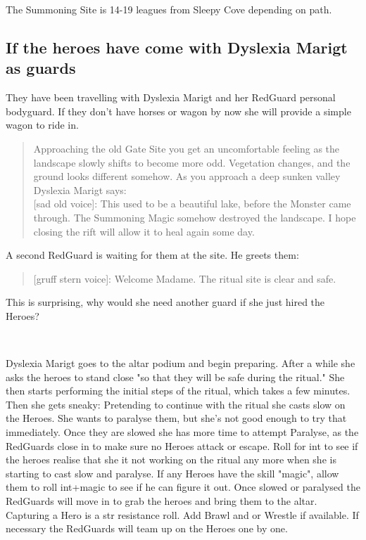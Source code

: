 \documentclass[11pt, twoside, titlepage, a4paper]{report}
\newenvironment{readoutloud}%
{\begin{quote}\begin{itshape}}%
{\end{itshape}\end{quote}}%
\begin{document}
The Summoning Site is 14-19 leagues from Sleepy Cove depending on path.


\subsection*{If the heroes have come with Dyslexia Marigt as guards}
They have been travelling with Dyslexia Marigt and her RedGuard personal bodyguard. If they don't have horses or wagon by now she will provide a simple wagon to ride in.
\begin{readoutloud}
Approaching the old Gate Site you get an uncomfortable feeling as the landscape slowly shifts to become more odd. Vegetation changes, and the ground looks different somehow. As you approach a deep sunken valley Dyslexia Marigt says:\\

\textnormal{[sad old voice]:} This used to be a beautiful lake, before the Monster came through. The Summoning Magic somehow destroyed the landscape. I hope closing the rift will allow it to heal again some day.
\end{readoutloud}

A second RedGuard is waiting for them at the site. He greets them:
\begin{readoutloud}
\textnormal{[gruff stern voice]:} Welcome Madame. The ritual site is clear and safe.
\end{readoutloud}
This is surprising, why would she need another guard if she just hired the Heroes?

\

Dyslexia Marigt goes to the altar podium and begin preparing. After a while she asks the heroes to stand close "so that they will be safe during the ritual."
She then starts performing the initial steps of the ritual, which takes a few minutes. Then she gets sneaky: Pretending to continue with the ritual she casts slow on the Heroes. She wants to paralyse them, but she's not good enough to try that immediately. Once they are slowed she has more time to attempt Paralyse, as the RedGuards close in to make sure no Heroes attack or escape.
Roll for int to see if the heroes realise that she it not working on the ritual any more when she is starting to cast slow and paralyse. If any Heroes have the skill "magic", allow them to roll int+magic to see if he can figure it out.
Once slowed or paralysed the RedGuards will move in to grab the heroes and bring them to the altar. Capturing a Hero is a str resistance roll. Add Brawl and or Wrestle if available. If necessary the RedGuards will team up on the Heroes one by one.
\end{document}
